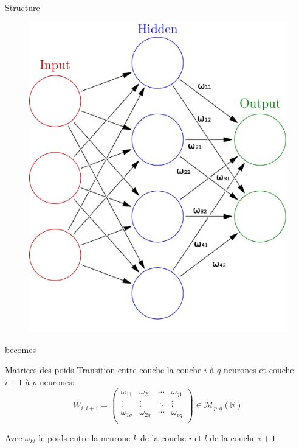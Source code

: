\documentclass[10pt]{beamer}
\begin{document}
\begin{frame}[fragile]{Structure}
	\begin{figure}
  \includegraphics[scale=0.4]{structure2}
	\centering
	\end{figure}
  \begin{center}becomes\end{center}
\end{frame}

\begin{frame}{Matrices des poids}
	Transition entre couche la couche $i$ \`a $q$ neurones et couche $i+1$ \`a $p$ neurones:
	\[W_{i,i+1} = \begin{pmatrix}
		\omega_{11} & \omega_{21} & \cdots & \omega_{q1}\\
		\vdots & \vdots & \ddots & \vdots\\
		\omega_{1q} & \omega_{2q} & \cdots & \omega_{pq}\\
	\end{pmatrix} \in \mathscr{M}_{p,q}(\mathbb{R})\]

	Avec $\omega_{kl}$ le poids entre la neurone $k$ de la couche $i$ et $l$ de la couche $i+1$
\end{frame}
\end{document}
